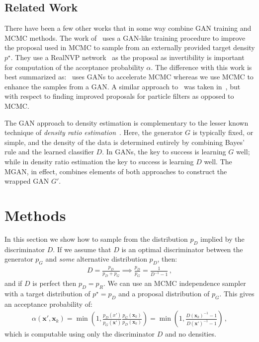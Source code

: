 \documentclass{article}
\renewcommand{\vec}[1]{{\boldsymbol{\mathbf{#1}}}} %
\newcommand{\target}{{p^\star}}
\newcommand{\PG}{{p_G}}
\newcommand{\PD}{{p_D}}
\newcommand{\PR}{{p_R}}
\newcommand{\accept}{\alpha}
\begin{document}
\subsection{Related Work}

There have been a few other works that in some way combine GAN training and MCMC methods.
The work of~\citet{Song2017} uses a GAN-like training procedure to improve the proposal used in MCMC to sample from an externally provided target density $\target$.
They use a RealNVP network~\citep{Dinh2016} as the proposal as invertibility is important for computation of the acceptance probability $\accept$.
The difference with this work is best summarized as:~\citet{Song2017} uses GANs to accelerate MCMC whereas we use MCMC to enhance the samples from a GAN\@.
A similar approach to~\citet{Song2017} was taken in~\citet{Kempinska2017}, but with respect to finding improved proposals for particle filters as opposed to MCMC\@.

The GAN approach to density estimation is complementary to the lesser known technique of \emph{density ratio estimation}~\citep{Sugiyama2012}.
Here, the generator $G$ is typically fixed, or simple, and the density of the data is determined entirely by combining Bayes' rule and the learned classifier $D$.
In GANs, the key to success is learning $G$ well; while in density ratio estimation the key to success is learning $D$ well.
The MGAN, in effect, combines elements of both approaches to construct the wrapped GAN $G'$.

\section{Methods}

In this section we show how to sample from the distribution $\PD$ implied by the discriminator $D$.
If we assume that $D$ is an optimal discriminator between the generator $\PG$ and \emph{some} alternative distribution $\PD$, then:
\begin{align}
  D = \frac{\PD}{\PD + \PG} \implies \frac{\PD}{\PG} = \frac{1}{D^{-1}-1}\,, \label{eq:PD def}
\end{align}
and if $D$ is perfect then $\PD = \PR$.
We can use an MCMC independence sampler with a target distribution of $\target=\PD$ and a proposal distribution of $\PG$.
This gives an acceptance probability of:
\begin{align}
  \accept(\vec x', \vec x_k)
    = \min\left(1, \frac{\PD(x')}{\PG(\vec x')} \frac{\PG(\vec x_k)}{\PD(\vec x_k)}\right)
    = \min\left(1, \frac{D(\vec x_k)^{-1} - 1}{D(\vec x')^{-1} - 1}\right)\,, \label{eq:alpha from D}
\end{align}
which is computable using only the discriminator $D$ and no densities.
\end{document}
